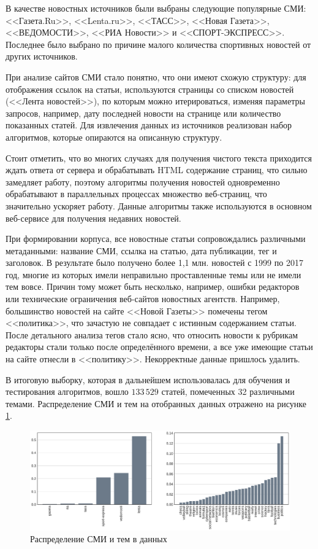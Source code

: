 \documentclass[a4paper, 14pt]{extarticle}
\begin{document}
В качестве новостных источников были выбраны следующие популярные СМИ:
<<Газета.Ru>>, <<Lenta.ru>>, <<ТАСС>>, <<Новая Газета>>, <<ВЕДОМОСТИ>>, <<РИА Новости>> и <<СПОРТ-ЭКСПРЕСС>>.
Последнее было выбрано по причине малого количества спортивных новостей от других источников.

При анализе сайтов СМИ стало понятно, что они имеют схожую структуру: для отображения ссылок на статьи,
используются страницы со списком новостей (<<Лента новостей>>), по которым можно итерироваться,
изменяя параметры запросов, например, дату последней новости на странице или количество показанных статей.
Для извлечения данных из источников реализован набор алгоритмов, которые опираются на описанную структуру.

Стоит отметить, что во многих случаях для получения чистого текста приходится ждать ответа от сервера и обрабатывать 
HTML содержание страниц, что сильно замедляет работу, поэтому алгоритмы получения новостей одновременно обрабатывают
в параллельных процессах множество веб-страниц, что значительно ускоряет работу. Данные алгоритмы также используются в основном
веб-сервисе для получения недавних новостей.

При формировании корпуса, все новостные статьи сопровождались различными метаданными: название СМИ, ссылка на статью,
дата публикации, тег и заголовок. В результате было получено более 1,1 млн. новостей с 1999 по 2017 год, многие из 
которых имели неправильно проставленные темы или не имели тем вовсе. Причин тому может быть несколько, например,
ошибки редакторов или технические ограничения веб-сайтов новостных агентств. Например, большинство новостей на сайте
<<Новой Газеты>> помечены тегом <<политика>>, что зачастую не совпадает с истинным содержанием статьи. После детального анализа тегов 
стало ясно, что относить новости к рубрикам редакторы стали только после определённого времени, а все уже имеющие 
статьи на сайте отнесли в <<политику>>. Некорректные данные пришлось удалить.

В итоговую выборку, которая в дальнейшем использовалась для обучения и тестирования алгоритмов,
вошло $133\,529$ статей, помеченных 32 различными темами. Распределение СМИ и тем на отобранных данных отражено на 
рисунке \ref{media_topic_distr}.
\begin{figure}[h!]
	\centering
	\includegraphics[width=1\textwidth]{media_topi_distr.pdf}
	\caption{Распределение СМИ и тем в данных}
	\label{media_topic_distr}
\end{figure}
\end{document}
